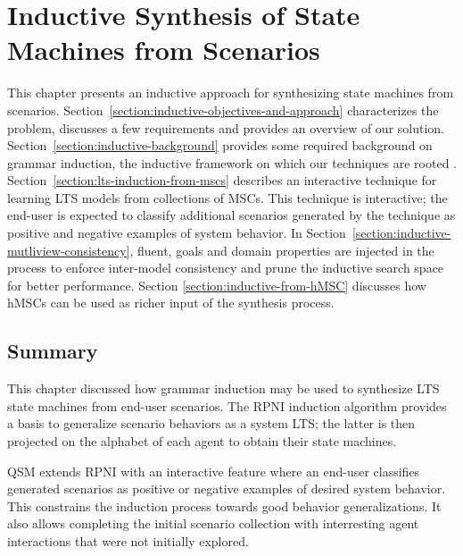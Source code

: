 \chapter{Inductive Synthesis of State Machines from Scenarios\label{chapter:inductive-synthesis}}

This chapter presents an inductive approach for synthesizing state machines from scenarios. Section~\ref{section:inductive-objectives-and-approach} characterizes the problem, discusses a few requirements and provides an overview of our solution. Section~\ref{section:inductive-background} provides some required background on grammar induction, the inductive framework on which our techniques are rooted \cite{Gold:1978}. Section~\ref{section:lts-induction-from-mscs} describes an interactive technique for learning LTS models from collections of MSCs. This technique is interactive; the end-user is expected to classify additional scenarios generated by the technique as positive and negative examples of system behavior. In Section~\ref{section:inductive-mutliview-consistency}, fluent, goals and domain properties are injected in the process to enforce inter-model consistency and prune the inductive search space for better performance. Section \ref{section:inductive-from-hMSC} discusses how hMSCs can be used as richer input of the synthesis process.









\section*{Summary}

This chapter discussed how grammar induction may be used to synthesize LTS state machines from end-user scenarios. The RPNI induction algorithm provides a basis to generalize scenario behaviors as a system LTS; the latter is then projected on the alphabet of each agent to obtain their state machines. 

QSM extends RPNI with an interactive feature where an end-user classifies generated scenarios as positive or negative examples of desired system behavior. This constrains the induction process towards good behavior generalizations. It also allows completing the initial scenario collection with interresting agent interactions that were not initially explored.

